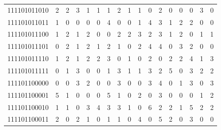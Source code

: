 \documentclass[10pt,a4paper]{article}
\begin{document}
\begin{longtable}{ |c|c|c|c|c|c|c|c|c|c|c|c|c|c|c|c|c| }
    111101011010              & 2                            & 2                                & 3                            & 1                              & 1   & 1   & 2   & 1   & 1   & 0   & 2   & 0   & 0   & 0   & 3   & 0   \\
    111101011011              & 1                            & 0                                & 0                            & 0                              & 0   & 4   & 0   & 0   & 1   & 4   & 3   & 1   & 2   & 2   & 0   & 0   \\
    111101011100              & 1                            & 2                                & 1                            & 2                              & 0   & 0   & 2   & 2   & 3   & 2   & 3   & 1   & 2   & 0   & 1   & 1   \\
    111101011101              & 0                            & 2                                & 1                            & 2                              & 1   & 2   & 1   & 0   & 2   & 4   & 4   & 0   & 3   & 2   & 0   & 0   \\
    111101011110              & 1                            & 2                                & 1                            & 2                              & 2   & 3   & 0   & 1   & 0   & 2   & 0   & 2   & 2   & 4   & 1   & 3   \\
    111101011111              & 0                            & 1                                & 3                            & 0                              & 0   & 1   & 3   & 1   & 1   & 3   & 2   & 5   & 0   & 3   & 2   & 2   \\
    111101100000              & 0                            & 0                                & 3                            & 2                              & 0   & 0   & 3   & 0   & 0   & 3   & 4   & 0   & 1   & 3   & 0   & 3   \\
    111101100001              & 5                            & 1                                & 0                            & 0                              & 0   & 5   & 1   & 0   & 2   & 0   & 3   & 0   & 0   & 0   & 1   & 2   \\
    111101100010              & 1                            & 1                                & 0                            & 3                              & 4   & 3   & 3   & 1   & 0   & 6   & 2   & 2   & 1   & 5   & 2   & 2   \\
    111101100011              & 2                            & 0                                & 2                            & 1                              & 0   & 1   & 1   & 0   & 4   & 0   & 5   & 2   & 0   & 3   & 0   & 0   \\

\end{longtable}
\end{document}
